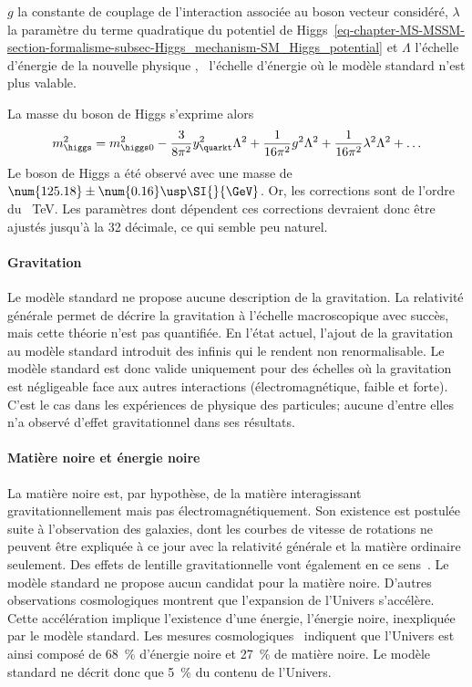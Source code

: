 $g$ la constante de couplage de l'interaction associée au boson vecteur considéré,
$\lambda$ la paramètre du terme quadratique du potentiel de Higgs~\eqref{eq-chapter-MS-MSSM-section-formalisme-subsec-Higgs_mechanism-SM_Higgs_potential} et
$\Lambda$ l'échelle d'énergie de la \og nouvelle physique \fg, \ie\ l'échelle d'énergie où le modèle standard n'est plus valable.
\par La masse du boson de Higgs s'exprime alors
\begin{equation}
m_{\higgs}^2 = m_{\higgs 0}^2 -\frac{3}{8\pi^2} y_{\quarkt}^2 \Lambda^2  +\frac{1}{16\pi^2} g^2 \Lambda^2 + \frac{1}{16\pi^2} \lambda^2 \Lambda^2 + \ldots
\end{equation}
Le boson de Higgs a été observé avec une masse de $\num{125.18}\pm\num{0.16}\usp\SI{}{\GeV}$.
Or, les corrections sont de l'ordre du \SI{}{\TeV}.
Les paramètres dont dépendent ces corrections devraient donc être ajustés jusqu'à la 32 décimale, ce qui semble peu naturel.
\paragraph{Gravitation}
Le modèle standard ne propose aucune description de la gravitation.
La relativité générale permet de décrire la gravitation à l'échelle macroscopique avec succès, mais cette théorie n'est pas quantifiée.
En l'état actuel, l'ajout de la gravitation au modèle standard introduit des infinis qui le rendent non renormalisable.
Le modèle standard est donc valide uniquement pour des échelles où la gravitation est négligeable face aux autres interactions (électromagnétique, faible et forte).
C'est le cas dans les expériences de physique des particules; aucune d'entre elles n'a observé d'effet gravitationnel dans ses résultats.
\paragraph{Matière noire et énergie noire}
La matière noire est, par hypothèse, de la matière interagissant gravitationnellement mais pas électromagnétiquement.
Son existence est postulée suite à l'observation des galaxies, dont les courbes de vitesse de rotations ne peuvent être expliquée à ce jour avec la relativité générale et la matière ordinaire seulement. Des effets de lentille gravitationnelle vont également en ce sens~\cite{Clowe_2006}.
Le modèle standard ne propose aucun candidat pour la matière noire.
D'autres observations cosmologiques montrent que l'expansion de l'Univers s'accélère. Cette accélération implique l'existence d'une énergie, l'énergie noire, inexpliquée par le modèle standard.
Les mesures cosmologiques~\cite{planck_2013} indiquent que l'Univers est ainsi composé de \SI{68}{\%} d'énergie noire et \SI{27}{\%} de matière noire. Le modèle standard ne décrit donc que \SI{5}{\%} du contenu de l'Univers.
